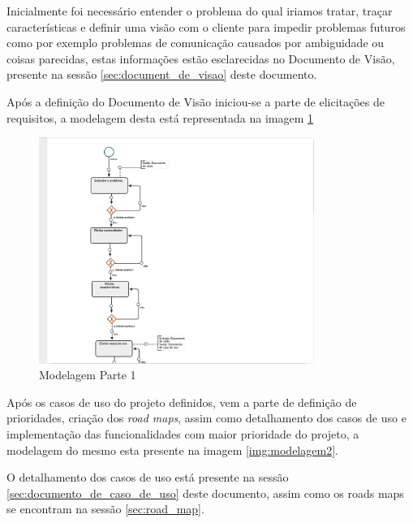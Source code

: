 Inicialmente foi necessário entender o problema do qual iriamos tratar, traçar características e definir uma visão com o cliente para impedir problemas futuros como por exemplo problemas de comunicação causados por ambiguidade ou coisas parecidas, estas informações estão esclarecidas no Documento de Visão, presente na sessão \ref{sec:document_de_visao} deste documento.

Após a definição do Documento de Visão iniciou-se a parte de elicitações de requisitos, a modelagem desta está representada na imagem \ref{img:modelagem1}

\begin{figure}[!h]
	\centering
	\includegraphics[width=0.8\textwidth]{imgModelagem/modelagem1}
	\caption{Modelagem Parte 1}
	\label{img:modelagem1}
\end{figure}

Após os casos de uso do projeto definidos, vem a parte de definição de prioridades, criação dos \textit{road maps}, assim como detalhamento dos casos de uso e implementação das funcionalidades com maior prioridade do projeto, a modelagem do mesmo esta presente na imagem \ref{img:modelagem2}.

O detalhamento dos casos de uso está presente na sessão \ref{sec:documento_de_caso_de_uso} deste documento, assim como os roads maps se encontram na sessão \ref{sec:road_map}.

